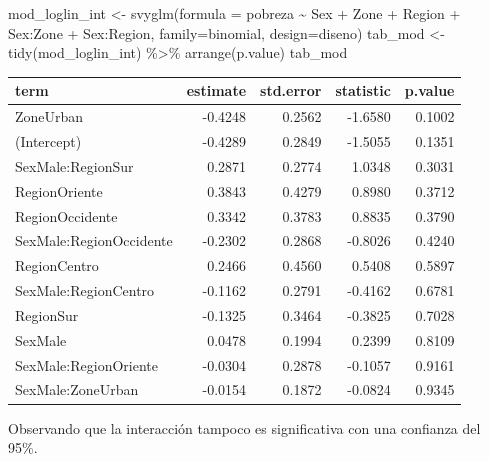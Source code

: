 \documentclass[
  12pt,
]{book}
\newenvironment{Shaded}{\begin{snugshade}}{\end{snugshade}}
\newcommand{\AttributeTok}[1]{\textcolor[rgb]{0.77,0.63,0.00}{#1}}
\newcommand{\FunctionTok}[1]{\textcolor[rgb]{0.00,0.00,0.00}{#1}}
\newcommand{\NormalTok}[1]{#1}
\newcommand{\OtherTok}[1]{\textcolor[rgb]{0.56,0.35,0.01}{#1}}
\newcommand{\SpecialCharTok}[1]{\textcolor[rgb]{0.00,0.00,0.00}{#1}}
\begin{document}
\begin{Shaded}
\begin{Highlighting}[]
\NormalTok{mod\_loglin\_int }\OtherTok{\textless{}{-}} \FunctionTok{svyglm}\NormalTok{(}\AttributeTok{formula =}\NormalTok{ pobreza }\SpecialCharTok{\textasciitilde{}}\NormalTok{ Sex }\SpecialCharTok{+}\NormalTok{ Zone }\SpecialCharTok{+}\NormalTok{ Region }\SpecialCharTok{+} 
\NormalTok{                           Sex}\SpecialCharTok{:}\NormalTok{Zone }\SpecialCharTok{+}\NormalTok{ Sex}\SpecialCharTok{:}\NormalTok{Region,}
                           \AttributeTok{family=}\NormalTok{binomial, }
                           \AttributeTok{design=}\NormalTok{diseno)}
\NormalTok{tab\_mod }\OtherTok{\textless{}{-}} \FunctionTok{tidy}\NormalTok{(mod\_loglin\_int) }\SpecialCharTok{\%\textgreater{}\%} \FunctionTok{arrange}\NormalTok{(p.value)}
\NormalTok{tab\_mod}
\end{Highlighting}
\end{Shaded}

\begin{tabular}{l|r|r|r|r}
\hline
term & estimate & std.error & statistic & p.value\\
\hline
ZoneUrban & -0.4248 & 0.2562 & -1.6580 & 0.1002\\
\hline
(Intercept) & -0.4289 & 0.2849 & -1.5055 & 0.1351\\
\hline
SexMale:RegionSur & 0.2871 & 0.2774 & 1.0348 & 0.3031\\
\hline
RegionOriente & 0.3843 & 0.4279 & 0.8980 & 0.3712\\
\hline
RegionOccidente & 0.3342 & 0.3783 & 0.8835 & 0.3790\\
\hline
SexMale:RegionOccidente & -0.2302 & 0.2868 & -0.8026 & 0.4240\\
\hline
RegionCentro & 0.2466 & 0.4560 & 0.5408 & 0.5897\\
\hline
SexMale:RegionCentro & -0.1162 & 0.2791 & -0.4162 & 0.6781\\
\hline
RegionSur & -0.1325 & 0.3464 & -0.3825 & 0.7028\\
\hline
SexMale & 0.0478 & 0.1994 & 0.2399 & 0.8109\\
\hline
SexMale:RegionOriente & -0.0304 & 0.2878 & -0.1057 & 0.9161\\
\hline
SexMale:ZoneUrban & -0.0154 & 0.1872 & -0.0824 & 0.9345\\
\hline
\end{tabular}

Observando que la interacción tampoco es significativa con una confianza del 95\%.
\end{document}
